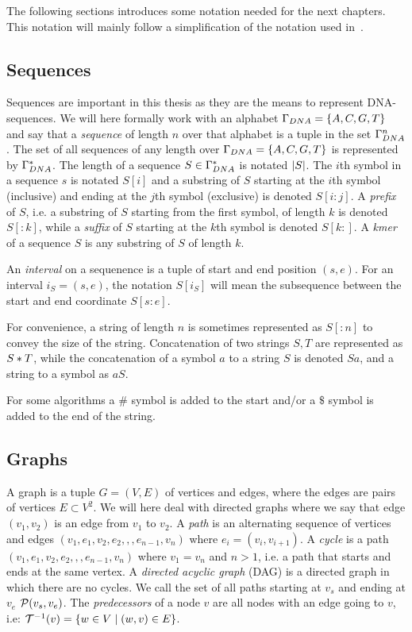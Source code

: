 The following sections introduces some notation needed for the next chapters. This notation will mainly follow a simplification of the notation used in~\cite{gcsa1}.
\subsection{Sequences}
Sequences are important in this thesis as they are the means to represent DNA-sequences.
We will here formally work with an alphabet $\Gamma_{DNA} = \left\{A, C, G, T\right\}$ and say that a \emph{sequence} of length $n$ over that alphabet is a tuple in the set $\Gamma_{DNA}^n$.
The set of all sequences of any length over $\Gamma_{DNA} = \left\{A, C, G, T\right\}$ is  represented by $\Gamma_{DNA}^*$.
The length of a sequence $S \in \Gamma_{DNA}^*$ is notated $\left|S\right|$.
The $i$th symbol in a sequence $s$ is notated $S[i]$ and a substring of $S$ starting at the $i$th symbol (inclusive) and ending at the $j$th symbol (exclusive) is denoted $S[i:j]$.
A \emph{prefix} of $S$, i.e. a substring of $S$ starting from the first symbol, of length $k$ is denoted $S[:k]$, while a \emph{suffix} of $S$ starting at the $k$th symbol is denoted $S[k:]$.
A \emph{kmer} of a sequence $S$ is any substring of $S$ of length $k$.

An \emph{interval} on a sequenence is a tuple of start and end position $(s, e)$.
For an interval $i_S=(s, e)$, the notation $S[i_S]$ will mean the subsequence between the start and end coordinate $S[s:e]$.

For convenience, a string of length $n$ is sometimes represented as $S[:n]$ to convey the size of the string.
Concatenation of two strings $S, T$ are represented as $S * T$, while the concatenation of a symbol $a$ to a string $S$ is denoted $Sa$, and a string to a symbol as $aS$.

For some algorithms a $\#$ symbol is added to the start and/or a $\$$ symbol is added to the end of the string.

\subsection{Graphs}
A graph is a tuple $G=(V, E)$ of vertices and edges, where the edges are pairs of vertices $E \subset V^2$.
We will here deal with directed graphs where we say that edge $(v_1, v_2)$ is an edge from $v_1$ to $v_2$.
A \emph{path} is an alternating sequence of vertices and edges $(v_1, e_1, v_2, e_2,,,e_{n-1}, v_n)$ where $e_i = (v_i, v_{i+1})$.
A \emph{cycle} is a path $(v_1, e_1, v_2, e_2,,,e_{n-1}, v_n)$ where $v_1=v_n$ and $n>1$, i.e. a path that starts and ends at the same vertex.
A \emph{directed acyclic graph} (DAG) is a directed graph in which there are no cycles.
We call the set of all paths starting at $v_s$ and ending at $v_e$ $\mathcal{P}(v_s, v_e)$.
The \emph{predecessors} of a node $v$ are all nodes with an edge going to $v$, i.e: $\mathcal{T}^{-1}(v) = \left\{w \in V \mid (w, v) \in E\right\}$.

